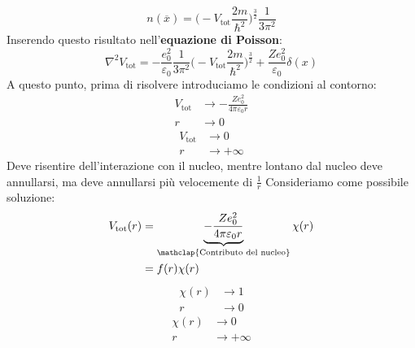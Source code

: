 \begin{equation*}
    n(\overline x)=\bigg(-V_{\text{tot}}\frac{2m}{\hbar^2}\bigg)^{\frac 32}\frac{1}{3\pi^2}
\end{equation*}
Inserendo questo risultato nell'\textbf{equazione di Poisson}:
\begin{equation*}
    \nabla^2V_{\text{tot}}=-\frac{e_0^2}{\varepsilon_0}\frac{1}{3\pi^2}\bigg(-V_{\text{tot}}\frac{2m}{\hbar^2}\bigg)^{\frac 32}+\frac{Ze_0^2}{\varepsilon_0}\delta(x)
\end{equation*}
A questo punto, prima di risolvere introduciamo le condizioni al contorno:
\begin{equation*}
    \begin{aligned}
    V_{\text{tot}} &\rightarrow - \frac{Ze_0^2}{4\pi\varepsilon_0r}\\
    r &\rightarrow 0
    \end{aligned}
\end{equation*}
\begin{equation*}
    \begin{aligned}
    V_{\text{tot}} &\rightarrow 0\\
    r &\rightarrow +\infty
    \end{aligned}
\end{equation*}
Deve risentire dell'interazione con il nucleo, mentre lontano dal nucleo deve annullarsi, ma deve annullarsi più velocemente di $\frac 1r$
Consideriamo come possibile soluzione:
\begin{equation*}
    \begin{aligned}
        V_{\text{tot}}(r) & =\underbrace{-\frac{Ze_0^2}{4\pi\varepsilon_0r}}_{\mathclap{\text{Contributo del nucleo}}}\chi(r) \\
        & =f(r)\chi(r)
    \end{aligned}
\end{equation*}
\begin{equation*}
    \begin{aligned}
        \chi(r) &\rightarrow  1\\
        r &\rightarrow 0
        \end{aligned}
\end{equation*}
\begin{equation*}
    \begin{aligned}
        \chi(r) &\rightarrow  0\\
        r &\rightarrow +\infty
        \end{aligned}
\end{equation*}
